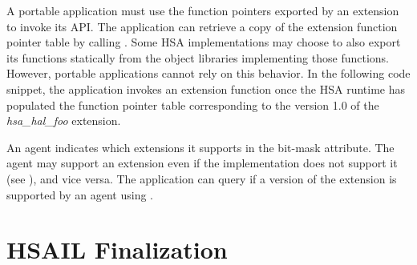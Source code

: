 \documentclass[oneside]{book}
\begin{document}
A portable application must use the function pointers exported by an extension
to invoke its API. The application can retrieve a copy of the extension function
pointer table by calling . Some HSA
implementations may choose to also export its functions statically from the
object libraries implementing those functions. However, portable applications
cannot rely on this behavior. In the following code snippet, the application
invokes an extension function once the HSA runtime has populated the function
pointer table corresponding to the version 1.0 of the \textit{hsa_hal_foo}
extension.


An agent indicates which extensions it supports in the
 bit-mask attribute. The agent may support
an extension even if the implementation does not support it (see
), and vice versa. The application can query
if a version of the extension is supported by an agent using
.

\section{HSAIL Finalization}\label{sec:finalizer}
\end{document}
